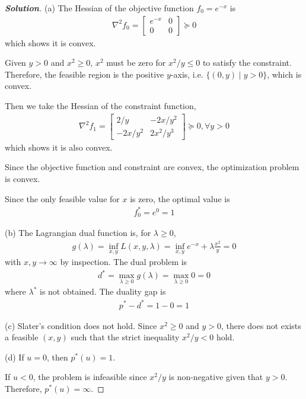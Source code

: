 \documentclass[11pt]{article}
\newenvironment{solution}
  {\renewcommand\qedsymbol{$\square$}\begin{proof}[\textbf{Solution}]}
  {\end{proof}}
\newcommand{\hess}{\nabla^2}
\begin{document}
\begin{solution}
(a) The Hessian of the objective function $f_0 = e^{-x}$ is
\begin{align*}
  \hess f_0 =
  \begin{bmatrix}
    e^{-x} & 0\\
    0 & 0
  \end{bmatrix}
  \succeq 0
\end{align*}
which shows it is convex.

Given $y>0$ and $x^2 \geq 0$, $x^2$ must be zero for $x^2/y \leq 0$ to satisfy the constraint. Therefore, the feasible region is the positive $y$-axis, i.e. $\{(0, y) \mid y>0\}$, which is convex.

Then we take the Hessian of the constraint function,
\begin{align*}
  \hess f_1 =
  \begin{bmatrix}
    2/y & -2x/y^2\\
    -2x/y^2 & 2x^2/y^3
  \end{bmatrix}
  \succeq 0, \forall y>0
\end{align*}
which shows it is also convex.

Since the objective function and constraint are convex, the optimization problem is convex. 

Since the only feasible value for $x$ is zero, the optimal value is 
\begin{align*}
    f_0^* = e^{0} = 1
\end{align*}

(b) The Lagrangian dual function is, for $\lambda \geq 0$,
\begin{align*}
    g(\lambda) 
    = \inf_{x,y} L(x, y, \lambda) 
    = \inf_{x,y} e^{-x} + \lambda \frac{x^2}{y} = 0
\end{align*}
with $x, y \to \infty$ by inspection. The dual problem is 
\begin{align*}
    d^* = \max_{\lambda \geq 0} g(\lambda) = \max_{\lambda \geq 0} 0 = 0
\end{align*}
where $\lambda^*$ is not obtained. The duality gap is
\begin{align*}
    p^* - d^* = 1 - 0 = 1
\end{align*}

(c) Slater's condition does not hold. Since $x^2 \geq 0$ and $y >0$, there does not exists a feasible $(x,y)$ such that the strict inequality $x^2/y < 0$ hold. 

(d) 
If $u = 0$, then $p^*(u) = 1$. 

If $u < 0$, the problem is infeasible since $x^2/y$ is non-negative given that $y>0$. Therefore, $p^*(u) = \infty$. 


\end{solution}
\end{document}
